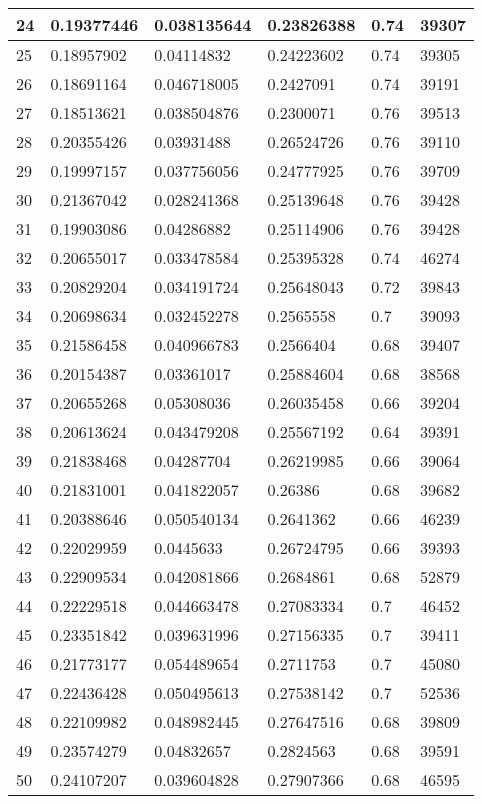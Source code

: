 \begin{longtable}{|l|l|l|l|l|l|}
24 & 0.19377446 & 0.038135644 & 0.23826388 & 0.74 & 39307 \\ \hline 
25 & 0.18957902 & 0.04114832 & 0.24223602 & 0.74 & 39305 \\ \hline 
26 & 0.18691164 & 0.046718005 & 0.2427091 & 0.74 & 39191 \\ \hline 
27 & 0.18513621 & 0.038504876 & 0.2300071 & 0.76 & 39513 \\ \hline 
28 & 0.20355426 & 0.03931488 & 0.26524726 & 0.76 & 39110 \\ \hline 
29 & 0.19997157 & 0.037756056 & 0.24777925 & 0.76 & 39709 \\ \hline 
30 & 0.21367042 & 0.028241368 & 0.25139648 & 0.76 & 39428 \\ \hline 
31 & 0.19903086 & 0.04286882 & 0.25114906 & 0.76 & 39428 \\ \hline 
32 & 0.20655017 & 0.033478584 & 0.25395328 & 0.74 & 46274 \\ \hline 
33 & 0.20829204 & 0.034191724 & 0.25648043 & 0.72 & 39843 \\ \hline 
34 & 0.20698634 & 0.032452278 & 0.2565558 & 0.7 & 39093 \\ \hline 
35 & 0.21586458 & 0.040966783 & 0.2566404 & 0.68 & 39407 \\ \hline 
36 & 0.20154387 & 0.03361017 & 0.25884604 & 0.68 & 38568 \\ \hline 
37 & 0.20655268 & 0.05308036 & 0.26035458 & 0.66 & 39204 \\ \hline 
38 & 0.20613624 & 0.043479208 & 0.25567192 & 0.64 & 39391 \\ \hline 
39 & 0.21838468 & 0.04287704 & 0.26219985 & 0.66 & 39064 \\ \hline 
40 & 0.21831001 & 0.041822057 & 0.26386 & 0.68 & 39682 \\ \hline 
41 & 0.20388646 & 0.050540134 & 0.2641362 & 0.66 & 46239 \\ \hline 
42 & 0.22029959 & 0.0445633 & 0.26724795 & 0.66 & 39393 \\ \hline 
43 & 0.22909534 & 0.042081866 & 0.2684861 & 0.68 & 52879 \\ \hline 
44 & 0.22229518 & 0.044663478 & 0.27083334 & 0.7 & 46452 \\ \hline 
45 & 0.23351842 & 0.039631996 & 0.27156335 & 0.7 & 39411 \\ \hline 
46 & 0.21773177 & 0.054489654 & 0.2711753 & 0.7 & 45080 \\ \hline 
47 & 0.22436428 & 0.050495613 & 0.27538142 & 0.7 & 52536 \\ \hline 
48 & 0.22109982 & 0.048982445 & 0.27647516 & 0.68 & 39809 \\ \hline 
49 & 0.23574279 & 0.04832657 & 0.2824563 & 0.68 & 39591 \\ \hline 
50 & 0.24107207 & 0.039604828 & 0.27907366 & 0.68 & 46595 \\ \hline 
\end{longtable}